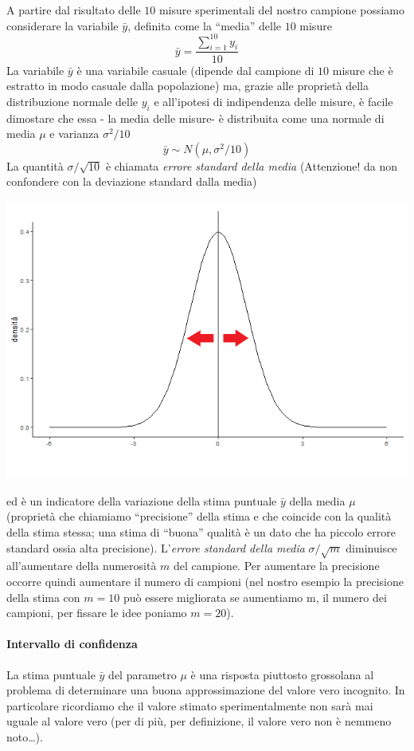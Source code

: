 \documentclass[
  11pt,
]{book}
\begin{document}
A partire dal risultato delle \(10\) misure sperimentali del nostro campione possiamo considerare la variabile \(\bar{y}\), definita come la ``media'' delle \(10\) misure
\[
\bar{y}=\frac{\sum_{i=1}^{10}y_i}{10}
\]
La variabile \(\bar{y}\) è una variabile casuale (dipende dal campione di \(10\) misure che è estratto in modo casuale dalla popolazione) ma, grazie alle proprietà della distribuzione normale delle \(y_i\) e all'ipotesi di indipendenza delle misure, è facile dimostare che essa - la media delle misure- è distribuita come una normale di media \(\mu\) e varianza \(\sigma^2/10\)
\[
\bar{y}\sim N(\mu,\sigma^2/10)
\]
La quantità \(\sigma/\sqrt{10}\) è chiamata \emph{errore standard della media}
(Attenzione! da non confondere con la deviazione standard dalla media)

\begin{center}\includegraphics[width=0.5\linewidth]{Immagini/Inferenziale/varianza_media} \end{center}

ed è un indicatore della variazione della stima puntuale \(\bar{y}\) della media \(\mu\) (proprietà che chiamiamo ``precisione'' della stima e che coincide con la qualità della stima stessa; una stima di ``buona'' qualità è un dato che ha piccolo errore standard ossia alta precisione).
L'\emph{errore standard della media} \(\sigma/\sqrt{m}\) diminuisce all'aumentare della numerosità \(m\) del campione. Per aumentare la precisione occorre quindi aumentare il numero di campioni (nel nostro esempio la precisione della stima con \(m=10\) può essere migliorata se aumentiamo m, il numero dei campioni, per fissare le idee poniamo \(m=20\)).

\hypertarget{intervallo-di-confidenza}{%
\paragraph{Intervallo di confidenza}\label{intervallo-di-confidenza}}

La stima puntuale \(\bar{y}\) del parametro \(\mu\) è una risposta piuttosto grossolana al problema di determinare una buona approssimazione del valore vero incognito.
In particolare ricordiamo che il valore stimato sperimentalmente non sarà mai uguale al valore vero (per di più, per definizione, il valore vero non è nemmeno noto\ldots).
\end{document}
